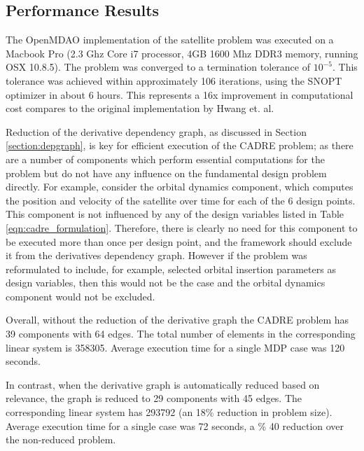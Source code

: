 \documentclass[]{aiaa-tc} %
\begin{document}
        \subsection{Performance Results}

            The OpenMDAO implementation of the satellite problem was executed on a
            Macbook Pro (2.3 Ghz Core i7 processor, 4GB 1600 Mhz DDR3 memory, running OSX 10.8.5). 
            The problem was converged to a termination tolerance of $10^{-5}$. This tolerance
            was achieved within approximately 106 iterations, using the SNOPT\cite{gill2005snopt}
            optimizer in about 6 hours. This represents a 16x improvement in computational
            cost compares to the original implementation by Hwang et. al. 


            Reduction of the derivative dependency graph, as discussed in
            Section \ref{section:depgraph}, is key for efficient execution
            of the CADRE problem; as there are a number of components which
            perform essential computations for the problem but do not have any influence
            on the fundamental design problem directly. For example, consider the orbital
            dynamics component, which computes the position and velocity of the satellite over
            time for each of the 6 design points. This component is not
            influenced by any of the design variables listed in Table \ref{eqn:cadre_formulation}. Therefore,
            there is clearly no need for this component to be executed more than once
            per design point, and the framework should exclude it from the
            derivatives dependency graph. However if the problem was
            reformulated to include, for example, selected orbital insertion parameters as
            design variables, then this would not be the case and the orbital
            dynamics component would not be excluded.

            Overall, without the reduction of the derivative graph the CADRE problem
            has 39 components with 64 edges. The total number of elements in
            the corresponding linear system is 358305. Average execution time
            for a single MDP case was 120 seconds.

            In contrast, when the derivative graph is automatically reduced based on
            relevance, the graph is reduced to 29 components with 45 edges.
            The corresponding linear system has 293792 (an 18\% reduction in
            problem size). Average execution time for a single case was
            72 seconds, a \% 40 reduction over the
            non-reduced problem.
\end{document}
